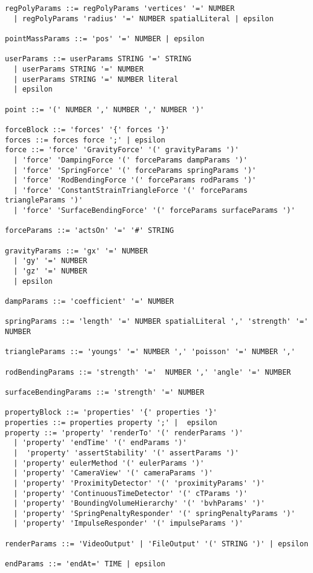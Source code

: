 \documentclass[letterpaper]{article}
\begin{document}
\begin{verbatim}
regPolyParams ::= regPolyParams 'vertices' '=' NUMBER
  | regPolyParams 'radius' '=' NUMBER spatialLiteral | epsilon

pointMassParams ::= 'pos' '=' NUMBER | epsilon

userParams ::= userParams STRING '=' STRING 
  | userParams STRING '=' NUMBER 
  | userParams STRING '=' NUMBER literal
  | epsilon

point ::= '(' NUMBER ',' NUMBER ',' NUMBER ')'

forceBlock ::= 'forces' '{' forces '}'
forces ::= forces force ';' | epsilon
force ::= 'force' 'GravityForce' '(' gravityParams ')' 
  | 'force' 'DampingForce '(' forceParams dampParams ')' 
  | 'force' 'SpringForce' '(' forceParams springParams ')' 
  | 'force' 'RodBendingForce '(' forceParams rodParams ')' 
  | 'force' 'ConstantStrainTriangleForce '(' forceParams triangleParams ')' 
  | 'force' 'SurfaceBendingForce' '(' forceParams surfaceParams ')' 

forceParams ::= 'actsOn' '=' '#' STRING

gravityParams ::= 'gx' '=' NUMBER
  | 'gy' '=' NUMBER
  | 'gz' '=' NUMBER
  | epsilon

dampParams ::= 'coefficient' '=' NUMBER

springParams ::= 'length' '=' NUMBER spatialLiteral ',' 'strength' '=' NUMBER

triangleParams ::= 'youngs' '=' NUMBER ',' 'poisson' '=' NUMBER ','

rodBendingParams ::= 'strength' '='  NUMBER ',' 'angle' '=' NUMBER

surfaceBendingParams ::= 'strength' '=' NUMBER

propertyBlock ::= 'properties' '{' properties '}'
properties ::= properties property ';' |  epsilon
property ::= 'property' 'renderTo' '(' renderParams ')' 
  | 'property' 'endTime' '(' endParams ')' 
  |  'property' 'assertStability' '(' assertParams ')' 
  | 'property' eulerMethod '(' eulerParams ')' 
  | 'property' 'CameraView' '(' cameraParams ')' 
  | 'property' 'ProximityDetector' '(' 'proximityParams' ')' 
  | 'property' 'ContinuousTimeDetector' '(' cTParams ')'
  | 'property' 'BoundingVolumeHierarchy' '(' 'bvhParams' ')'
  | 'property' 'SpringPenaltyResponder' '(' springPenaltyParams ')'
  | 'property' 'ImpulseResponder' '(' impulseParams ')'

renderParams ::= 'VideoOutput' | 'FileOutput' '(' STRING ')' | epsilon

endParams ::= 'endAt=' TIME | epsilon 


\end{verbatim}
\end{document}
